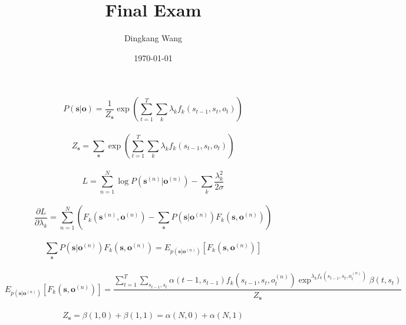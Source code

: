 \documentclass[11pt]{article}
\title {\vspace*{-2em}Final Exam}
\author{Dingkang Wang}
\date {\today}
\begin{document}
\maketitle

\begin{equation}
    P(\mathbf{s}|\mathbf{o}) = \frac{1}{Z_{\mathbf{s}}} \exp \left( \sum_{t=1}^{T} \sum_{k} \lambda_k f_k(s_{t-1}, s_t, o_t) \right)
\end{equation}
\\

\begin{equation}
    Z_{\mathbf{s}} = \sum_{\mathbf{s}} \exp \left( \sum_{t=1}^{T} \sum_{k} \lambda_k f_k(s_{t-1}, s_t, o_t) \right)
\end{equation}
\\

\begin{equation}
    L = \sum_{n=1}^{N} \log P( \mathbf{s}^{(n)} | \mathbf{o}^{(n)}) - \sum_{k} \frac{\lambda_k^2}{2\sigma}
\end{equation}
\\

\begin{equation}
    \frac{\partial L}{\partial \lambda_k} = \sum_{n=1}^{N} \left( F_k ( \mathbf{s}^{(n)}, \mathbf{o}^{(n)} ) - \sum_{\mathbf{s}} P( \mathbf{s} | \mathbf{o}^{(n)}) F_k ( \mathbf{s}, \mathbf{o}^{(n)} ) \right)
\end{equation}
\\

\begin{equation}
    \sum_{\mathbf{s}} P( \mathbf{s} | \mathbf{o}^{(n)}) F_k ( \mathbf{s}, \mathbf{o}^{(n)} ) = E_{p(\mathbf{s}|\mathbf{o}^{(n)})} [ F_k(\mathbf{s}, \mathbf{o}^{(n)}) ]
\end{equation}
\\

\begin{equation}
     E_{p(\mathbf{s}|\mathbf{o}^{(n)})} [ F_k(\mathbf{s}, \mathbf{o}^{(n)}) ] = \frac{\sum_{t=1}^{T} \sum_{s_{t-1}, s_t} \alpha(t-1, s_{t-1}) f_k(s_{t-1}, s_{t}, o^{(n)}_t) \exp^{\lambda_k f_k(s_{t-1}, s_{t}, o^{(n)}_t)} \beta(t, s_t)}{Z_{\mathbf{s}}}
\end{equation}
\\

\begin{equation}
     Z_{\mathbf{s}} = \beta(1, 0) + \beta(1, 1) = \alpha(N, 0) + \alpha(N, 1)
\end{equation}
\\
\end{document}
